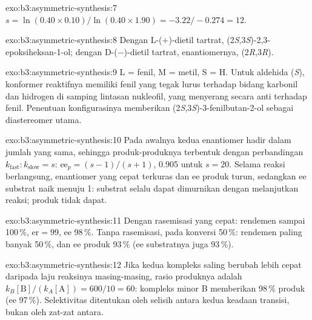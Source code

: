 \begin{solution}{exo:b3:asymmetric-synthesis:7}
$s = \ln(0.40 \times 0.10)/\ln(0.40 \times 1.90) = -3.22/-0.274 = 12$.
\end{solution}

\begin{solution}{exo:b3:asymmetric-synthesis:8}
Dengan L-($+$)-dietil tartrat, (2\textit{S},3\textit{S})-2,3-epoksiheksan-1-ol; dengan D-($-$)-dietil tartrat,
enantiomernya, (2\textit{R},3\textit{R}).
\end{solution}

\begin{solution}{exo:b3:asymmetric-synthesis:9}
L = fenil, M = metil, S = H. Untuk aldehida (\textit{S}), konformer reaktifnya memiliki fenil
yang tegak lurus terhadap bidang karbonil dan hidrogen di samping lintasan
nukleofil, yang menyerang secara anti terhadap fenil. Penentuan konfigurasinya memberikan
(2\textit{S},3\textit{S})-3-fenilbutan-2-ol sebagai diastereomer utama.
\end{solution}

\begin{solution}{exo:b3:asymmetric-synthesis:10}
Pada awalnya kedua enantiomer hadir dalam jumlah yang sama, sehingga produk-produknya
terbentuk dengan perbandingan $k_{\mathrm{fast}} : k_{\mathrm{slow}} = s$: $\mathrm{ee}_p = (s - 1)/(s + 1)$, 0.905 untuk $s = 20$. Selama reaksi berlangsung,
enantiomer yang cepat terkuras dan ee produk turun, sedangkan ee substrat naik
menuju 1: substrat selalu dapat dimurnikan dengan melanjutkan reaksi; produk
tidak dapat.
\end{solution}

\begin{solution}{exo:b3:asymmetric-synthesis:11}
Dengan rasemisasi yang cepat: rendemen sampai 100\,\%, $\mathrm{er} = 99$, ee 98\,\%. Tanpa rasemisasi, pada konversi
50\,\%: rendemen paling banyak 50\,\%, dan ee produk 93\,\% (ee substratnya
juga 93\,\%).
\end{solution}

\begin{solution}{exo:b3:asymmetric-synthesis:12}
Jika kedua kompleks saling berubah lebih cepat daripada laju reaksinya masing-masing, rasio produknya adalah
$k_B[\mathrm B]/(k_A[\mathrm A]) = 600/10 = 60$: kompleks minor B memberikan 98\,\% produk (ee 97\,\%).
Selektivitas ditentukan oleh selisih antara kedua keadaan transisi, bukan oleh
 zat-zat antara.
\end{solution}

